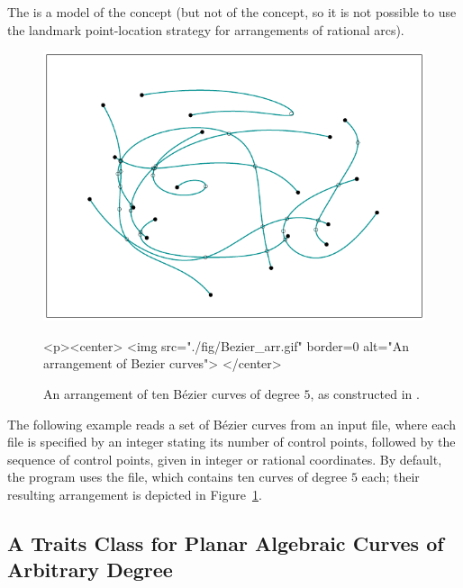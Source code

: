 The  is a model of the
 concept (but not of the
 concept, so it is not possible
to use the landmark point-location strategy for arrangements of
rational arcs).

\begin{figure}[t]
\begin{ccTexOnly}
  \begin{center}
  \includegraphics{Arrangement_on_surface_2/fig/Bezier_arr}
  \end{center}
\end{ccTexOnly}
\begin{ccHtmlOnly}
  <p><center>
  <img src="./fig/Bezier_arr.gif" border=0 alt="An arrangement of Bezier curves">
  </center>
\end{ccHtmlOnly}
\caption{An arrangement of ten B\'ezier curves of degree $5$, as
constructed in .\label{arr_fig:ex_bez}}
\end{figure}

The following example reads a set of B\'ezier curves from an input
file, where each file is specified by an integer stating its number
of control points, followed by the sequence of control points, given
in integer or rational coordinates. By default, the program uses
the  file, which contains ten curves of degree $5$
each; their resulting arrangement is depicted in
Figure~\ref{arr_fig:ex_bez}.


\subsection{A Traits Class for Planar Algebraic Curves of Arbitrary Degree
  \label{arr_ssec:tr_alg}}

